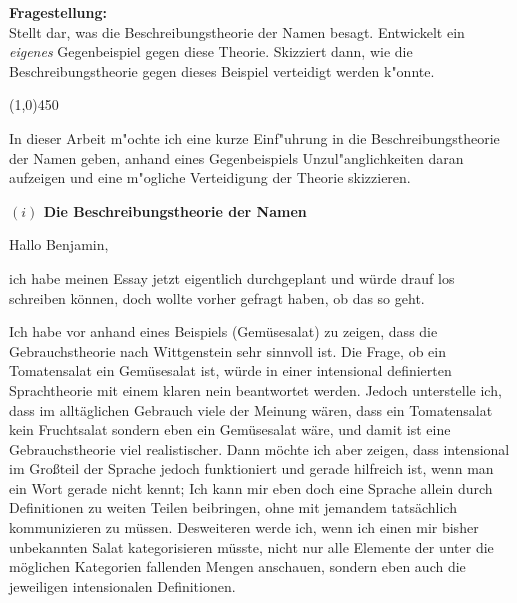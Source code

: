 \documentclass[a4paper, emulatestandardclasses, 12pt]{scrartcl}
\begin{document}
\begin{onehalfspace} 

\noindent\textbf{Fragestellung:}\\
Stellt dar, was die Beschreibungstheorie der Namen besagt. Entwickelt ein \emph{eigenes} Gegenbeispiel gegen diese Theorie. Skizziert dann, wie die Beschreibungstheorie gegen dieses Beispiel verteidigt werden k"onnte.
\begin{center}
\vspace{-9pt}\line(1,0){450}
\end{center}

\vspace{0mm}
\noindent In dieser Arbeit m"ochte ich eine kurze Einf"uhrung in die Beschreibungstheorie der Namen geben, anhand eines Gegenbeispiels Unzul"anglichkeiten daran aufzeigen und eine m"ogliche Verteidigung der Theorie skizzieren.  

\vspace{3mm}

\noindent\textbf{$(i)$ Die Beschreibungstheorie der Namen}

Hallo Benjamin,

ich habe meinen Essay jetzt eigentlich durchgeplant und würde drauf los schreiben können,
doch wollte vorher gefragt haben, ob das so geht.

Ich habe vor anhand eines Beispiels (Gemüsesalat) zu zeigen, dass die Gebrauchstheorie nach Wittgenstein sehr sinnvoll ist.
Die Frage, ob ein Tomatensalat ein Gemüsesalat ist, würde in einer intensional definierten Sprachtheorie mit einem klaren nein beantwortet werden. Jedoch unterstelle ich, dass im alltäglichen Gebrauch viele der Meinung wären, dass ein Tomatensalat kein Fruchtsalat sondern eben ein Gemüsesalat wäre, und damit ist eine Gebrauchstheorie viel realistischer.
Dann möchte ich aber zeigen, dass intensional im Großteil der Sprache jedoch funktioniert und gerade hilfreich ist, wenn man ein Wort gerade nicht kennt; Ich kann mir eben doch eine Sprache allein durch Definitionen zu weiten Teilen beibringen, ohne mit jemandem tatsächlich kommunizieren zu müssen. Desweiteren werde ich, wenn ich einen mir bisher unbekannten Salat kategorisieren müsste, nicht nur alle Elemente der unter die möglichen Kategorien fallenden Mengen anschauen, sondern eben auch die jeweiligen intensionalen Definitionen.


\end{onehalfspace}
\end{document}
